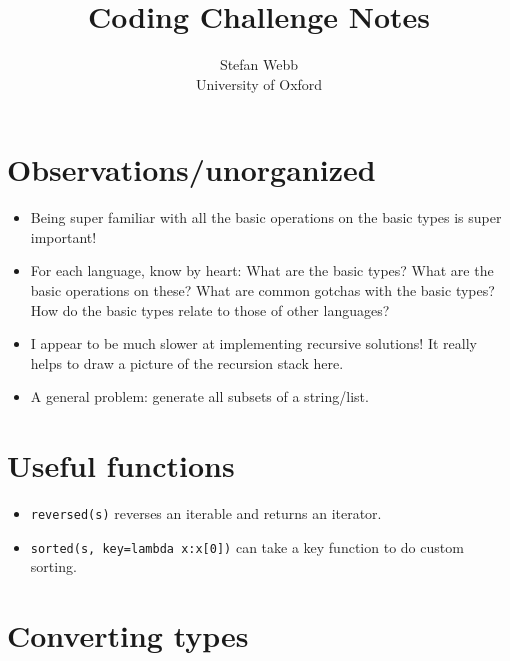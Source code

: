 \documentclass[12pt]{article}
\title{Coding Challenge Notes}
\author{
  Stefan Webb \\
  University of Oxford \\
}
\begin{document}
\lstset{language=Python,xleftmargin=12pt,basicstyle=\ttfamily\footnotesize,aboveskip=-6pt, belowskip=0pt,tabsize=2,breaklines=true}
\newcommand{\python}[1]{\lstinline[columns=fixed]{#1}}

\suppressfloats

\setlength{\abovedisplayskip}{3.5pt}
\setlength{\belowdisplayskip}{3.5pt}
\setlength{\abovedisplayshortskip}{3.5pt}
\setlength{\belowdisplayshortskip}{3.5pt}	

\maketitle

%  

\section{Observations/unorganized}
\begin{itemize}
  \item Being super familiar with all the basic operations on the basic types is super important!
  \item For each language, know by heart: What are the basic types? What are the basic operations on these? What are common gotchas with the basic types? How do the basic types relate to those of other languages?
  \item I appear to be much slower at implementing recursive solutions! It really helps to draw a picture of the recursion stack here.
  \item A general problem: generate all subsets of a string/list.
\end{itemize}

\section{Useful functions}
\begin{itemize}
  \item \python{reversed(s)} reverses an iterable and returns an iterator.
  \item \python{sorted(s, key=lambda x:x[0])} can take a key function to do custom sorting.
\end{itemize}

\section{Converting types}
\end{document}
